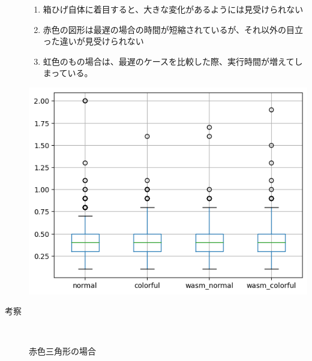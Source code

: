 \begin{description}
\begin{minipage}[t]{0.4\textwidth}
		\begin{enumerate}[parsep=-0.5\zh]
			\item 箱ひげ自体に着目すると、大きな変化があるようには見受けられない
			\item 赤色の図形は最遅の場合の時間が短縮されているが、それ以外の目立った違いが見受けられない
			\item 虹色のもの場合は、最遅のケースを比較した際、実行時間が増えてしまっている。
		\end{enumerate}
	\end{minipage}
	\begin{minipage}[t]{0.6\textwidth}\vspace{0pt}
		\begin{center}
			\includegraphics[keepaspectratio, width=.9\linewidth,trim={0mm 0mm 0mm 0mm},clip]{box_chart.png}
		\end{center}
	\end{minipage}
	\newpage
	\item[考察]~\\
	\begin{description}
		\item[赤色三角形の場合]~\\

\end{description}
\end{description}
